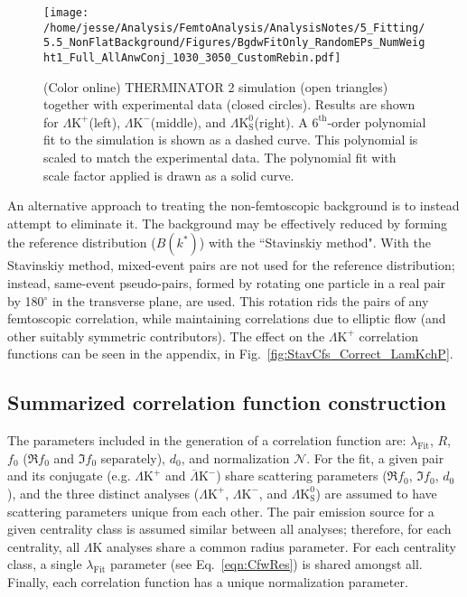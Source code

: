 \documentclass[ALICE,manyauthors]{cernphprep}
\newcommand{\LamK}{$\Lambda$K\xspace}
\newcommand{\LamKchP}{$\Lambda\mathrm{K^{+}}$\xspace}
\newcommand{\ALamKchM}{$\overline{\Lambda}\mathrm{K^{-}}$\xspace}
\newcommand{\LamKchM}{$\Lambda\mathrm{K^{-}}$\xspace}
\newcommand{\LamKs}{$\Lambda\mathrm{K^{0}_{S}}$\xspace}
\begin{document}
\begin{figure}[h]
  \centering
  \texttt{[image: /home/jesse/Analysis/FemtoAnalysis/AnalysisNotes/5\_Fitting/5.5\_NonFlatBackground/Figures/BgdwFitOnly\_RandomEPs\_NumWeight1\_Full\_AllAnwConj\_1030\_3050\_CustomRebin.pdf]}
  \caption[Backgrounds with THERMINATOR 2]
  {
  (Color online) THERMINATOR 2 simulation (open triangles) together with experimental data (closed circles).  
  Results are shown for \LamKchP (left), \LamKchM (middle), and \LamKs (right).
  A $6^{\mathrm{th}}$-order polynomial fit to the simulation is shown as a dashed curve.  
  This polynomial is scaled to match the experimental data.  
  The polynomial fit with scale factor applied is drawn as a solid curve.
  }
  \label{fig:BgdswTHERM}
\end{figure} 


An alternative approach to treating the non-femtoscopic background is to instead attempt to eliminate it.
The background may be effectively reduced by forming the reference distribution ($B(k^{*})$) with the ``Stavinskiy method".
With the Stavinskiy method, mixed-event pairs are not used for the reference distribution; instead, same-event pseudo-pairs, formed by rotating one particle in a real pair by 180$^\circ$ in the transverse plane, are used.  
This rotation rids the pairs of any femtoscopic correlation, while maintaining correlations due to elliptic flow (and other suitably symmetric contributors).
The {\color{blue}{flattening}} effect {\color{blue}{of the method}} on the \LamKchP correlation functions can be seen in the appendix, in Fig.\ \ref{fig:StavCfs_Correct_LamKchP}.

\subsection{Summarized correlation function construction}
\label{SummarizedFitProcedure}

The parameters included in the generation of a correlation function are: $\lambda_{\mathrm{Fit}}$, $R$, $f_{0}$ ($\Re f_{0}$ and $\Im f_{0}$ separately), $d_{0}$, and normalization $\mathcal{N}$.
For the fit, a given pair and its conjugate (e.g. \LamKchP and \ALamKchM) share scattering parameters ($\Re f_{0}$, $\Im f_{0}$, $d_{0}$), and the three distinct analyses (\LamKchP, \LamKchM, and \LamKs) are assumed to have scattering parameters unique from each other.
The pair emission source for a given centrality class is assumed similar between all analyses; therefore, for each centrality, all \LamK analyses share a common radius parameter.
For each centrality class, a single $\lambda_{\mathrm{Fit}}$ parameter (see Eq.\ \ref{eqn:CfwRes}) is shared amongst all.
Finally, each correlation function has a unique normalization parameter.
\end{document}

